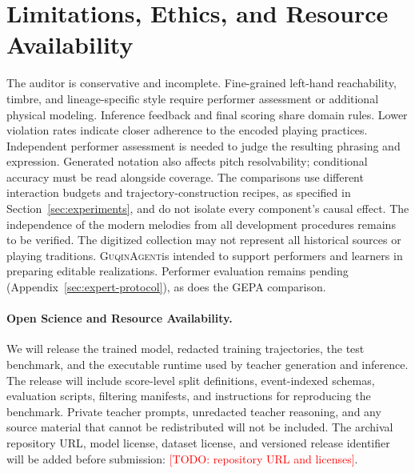 \documentclass[11pt]{article}
\newcommand{\system}{\textsc{GuqinAgent}}
\newcommand{\todo}[1]{\textcolor{red}{[TODO: #1]}}
\begin{document}
\section{Limitations, Ethics, and Resource Availability}
The auditor is conservative and incomplete. Fine-grained left-hand reachability, timbre, and lineage-specific style require performer assessment or additional physical modeling. Inference feedback and final scoring share domain rules. Lower violation rates indicate closer adherence to the encoded playing practices. Independent performer assessment is needed to judge the resulting phrasing and expression. Generated notation also affects pitch resolvability; conditional accuracy must be read alongside coverage. The comparisons use different interaction budgets and trajectory-construction recipes, as specified in Section~\ref{sec:experiments}, and do not isolate every component's causal effect. The independence of the modern melodies from all development procedures remains to be verified. The digitized collection may not represent all historical sources or playing traditions. \system is intended to support performers and learners in preparing editable realizations. Performer evaluation remains pending (Appendix~\ref{sec:expert-protocol}), as does the GEPA comparison.

\paragraph{Open Science and Resource Availability.}
We will release the trained model, redacted training trajectories, the test benchmark, and the executable runtime used by teacher generation and inference. The release will include score-level split definitions, event-indexed schemas, evaluation scripts, filtering manifests, and instructions for reproducing the benchmark. Private teacher prompts, unredacted teacher reasoning, and any source material that cannot be redistributed will not be included. The archival repository URL, model license, dataset license, and versioned release identifier will be added before submission: \todo{repository URL and licenses}.



\end{document}
